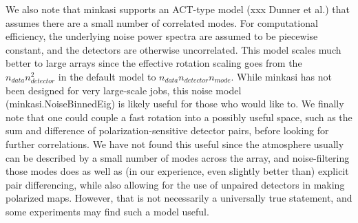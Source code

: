\documentclass[12]{article}
\begin{document}
We also note that minkasi supports an ACT-type model (xxx Dunner et
al.) that assumes there are a small number of correlated modes.  For
computational efficiency, the underlying noise power spectra are
assumed to be piecewise constant, and the detectors are otherwise
uncorrelated.  This model scales much better to large arrays since the
effective rotation scaling goes from the $n_{data}n_{detector}^2$ in
the default model to $n_{data}n_{detector}n_{mode}$.  While minkasi
has not been designed for very large-scale jobs, this noise model
(minkasi.NoiseBinnedEig) is likely useful for those who would like
to.  We finally note that one could couple a fast rotation into a
possibly useful space, such as the sum and difference of
polarization-sensitive detector pairs, before looking for further
correlations.  We have not found this useful since the atmosphere
usually can be described by a small number of modes across the array,
and noise-filtering those modes does as well as (in our experience,
even slightly better than) explicit pair differencing, while also
allowing for the use of unpaired detectors in making polarized maps.
However, that is not necessarily a universally true statement, and
some experiments may find such a model useful.
\end{document}
